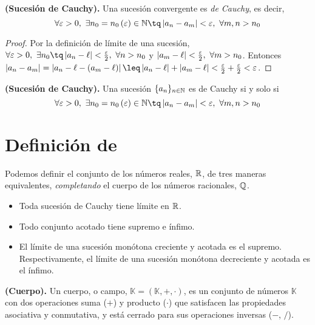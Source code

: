 \begin{lemma}
    \textbf{(Sucesión de Cauchy).} Una sucesión convergente es \textit{de Cauchy}, es decir,
    \begin{equation}
        \forall\epsilon > 0,\ \exists n_0 = n_0\left( \epsilon \right) \in\N\tq \abs{a_n - a_m} < \epsilon,\ \forall m, n > n_0
    \end{equation}
\end{lemma}

\begin{proof}
    Por la definición de límite de una sucesión, $\forall\epsilon > 0,\ \exists n_0 \tq \abs{a_n - \ell} < \frac{\epsilon}{2},\ \forall n > n_0$ y $\left\vert a_m - \ell \right\vert < \frac{\varepsilon}{2},\ \forall m > n_0$.
    Entonces $\abs{a_n - a_m} = \abs{a_n - \ell - \left( a_m - \ell \right) }\leq \abs{a_n - \ell} + \abs{a_m - \ell} < \frac{\epsilon}{2} + \frac{\epsilon}{2} < \epsilon$.
\end{proof}

\begin{defi}
    \textbf{(Sucesión de Cauchy).} Una sucesión $\{a_n\}_{n\in\mathbb{N}} $ es de Cauchy si y solo si
    \begin{equation}
        \forall\epsilon > 0,\ \exists n_0 = n_0\left( \epsilon \right) \in\N\tq \abs{a_n - a_m} < \epsilon,\ \forall m, n > n_0
    \end{equation}
\end{defi}

\section{Definición de \R}
Podemos definir el conjunto de los números reales, $\mathbb{R}$, de tres maneras equivalentes, \textit{completando} el cuerpo de los números racionales, $\mathbb{Q}$.
\begin{itemize}
    \item Toda sucesión de Cauchy tiene límite en $\mathbb{R}$.
    \item Todo conjunto acotado tiene supremo e ínfimo.
    \item El límite de una sucesión monótona creciente y acotada es el supremo. Respectivamente, el límite de una sucesión monótona decreciente y acotada es el ínfimo.
\end{itemize}

\begin{defi}
    \textbf{(Cuerpo).} Un cuerpo, o campo, $\mathbb{K} = \left(\mathbb{K}, +, \cdot\right)$, es un conjunto de números $\mathbb{K}$ con dos operaciones suma ($+$) y producto ($\cdot$) que satisfacen las propiedades asociativa y conmutativa, y está cerrado para sus operaciones inversas ($-$, $/$).
\end{defi}

